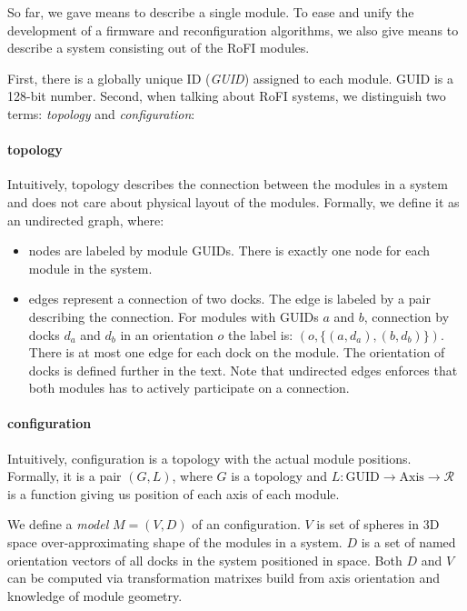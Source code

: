 So far, we gave means to describe a single module. To ease and unify the
development of a firmware and reconfiguration algorithms, we also give means to
describe a system consisting out of the RoFI modules.

First, there is a globally unique ID (\emph{GUID}) assigned to each module. GUID
is a 128-bit number. Second, when talking about RoFI systems, we distinguish two
terms: \emph{topology} and \emph{configuration}:

\paragraph{topology} Intuitively, topology describes the connection between the
modules in a system and does not care about physical layout of the modules.
Formally, we define it as an undirected graph, where:
\begin{itemize}
    \item nodes are labeled by module GUIDs. There is exactly one node for each
    module in the system.
    \item edges represent a connection of two docks. The edge is labeled by a
    pair describing the connection. For modules with GUIDs $a$ and $b$,
    connection by docks $d_a$ and $d_b$ in an orientation $o$ the label is: $(o,
    \{(a, d_a), (b, d_b)\})$. There is at most one edge for each dock on the
    module. The orientation of docks is defined further in the text. Note that
    undirected edges enforces that both modules has to actively participate on a
    connection.
\end{itemize}

\paragraph{configuration} Intuitively, configuration is a topology with the
actual module positions. Formally, it is a pair $(G, L)$, where $G$ is a
topology and $L: \text{GUID} \rightarrow \text{Axis} \rightarrow \mathcal{R}$ is
a function giving us position of each axis of each module.

We define a \emph{model} $M = (V, D)$ of an configuration. $V$ is set of spheres
in 3D space over-approximating shape of the modules in a system. $D$ is a set of
named orientation vectors of all docks in the system positioned in space. Both
$D$ and $V$ can be computed via transformation matrixes build from axis
orientation and knowledge of module geometry.

